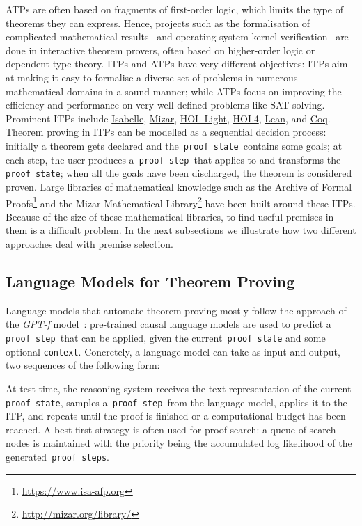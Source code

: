 \documentclass{article}
\begin{document}
ATPs are often based on fragments of first-order logic, which limits the type of theorems they can express.
Hence, projects such as the formalisation of complicated mathematical results~\citep{gonthier2008formal, avigad2007formally, gonthier2013machine, scholze2021liquid} and operating system kernel verification~\citep{klein2009sel4} are done in interactive theorem provers, often based on higher-order logic or dependent type theory. 
ITPs and ATPs have very different objectives: ITPs aim at making it easy to formalise a diverse set of problems in numerous mathematical domains in a sound manner; while ATPs focus on improving the efficiency and performance on very well-defined problems like SAT solving.
Prominent ITPs include \href{https://www.cl.cam.ac.uk/research/hvg/Isabelle/}{Isabelle}, \href{http://mizar.org}{Mizar}, \href{https://www.cl.cam.ac.uk/~jrh13/hol-light/}{HOL Light}, \href{https://hol-theorem-prover.org}{HOL4}, \href{https://leanprover.github.io}{Lean}, and \href{https://coq.inria.fr}{Coq}. 
Theorem proving in ITPs can be modelled as a sequential decision process: initially a theorem gets declared and the\texttt{ proof state }contains some goals; at each step, the user produces a\texttt{ proof step }that applies to and transforms the\texttt{ proof state}; when all the goals have been discharged, the theorem is considered proven. 
Large libraries of mathematical knowledge such as the Archive of Formal Proofs\footnote{\href{https://www.isa-afp.org}{https://www.isa-afp.org}} and the Mizar Mathematical Library\footnote{\href{http://mizar.org/library/}{http://mizar.org/library/}} have been built around these ITPs.
Because of the size of these mathematical libraries, to find useful premises in them is a difficult problem. 
In the next subsections we illustrate how two different approaches deal with premise selection.


\subsection{Language Models for Theorem Proving}
\label{subsec: lmtp}
Language models that automate theorem proving mostly follow the approach of the \textit{GPT-f} model~\citep{polu2020generative}: pre-trained causal language models are used to predict a\texttt{ proof step }that can be applied, given the current\texttt{ proof state} and some optional \texttt{context}. Concretely, a language model can take as input and output, two sequences of the following form:

At test time, the reasoning system receives the text representation of the current\texttt{ proof state}, samples a\texttt{ proof step }from the language model, applies it to the ITP, and repeats until the proof is finished or a computational budget has been reached.
A best-first strategy is often used for proof search: a queue of search nodes is maintained with the priority being the accumulated log likelihood of the generated\texttt{ proof steps}.
\end{document}
